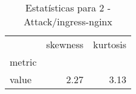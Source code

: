 \begin{table}[htbp]
\caption{Estatísticas para 2 - Attack/ingress-nginx}
\label{tab:2_-_attack_ingress-nginx_skewkurt}
\begin{tabular}{lrr}
\toprule
 & skewness & kurtosis \\
metric &  &  \\
\midrule
value & 2.27 & 3.13 \\
\bottomrule
\end{tabular}
\end{table}
